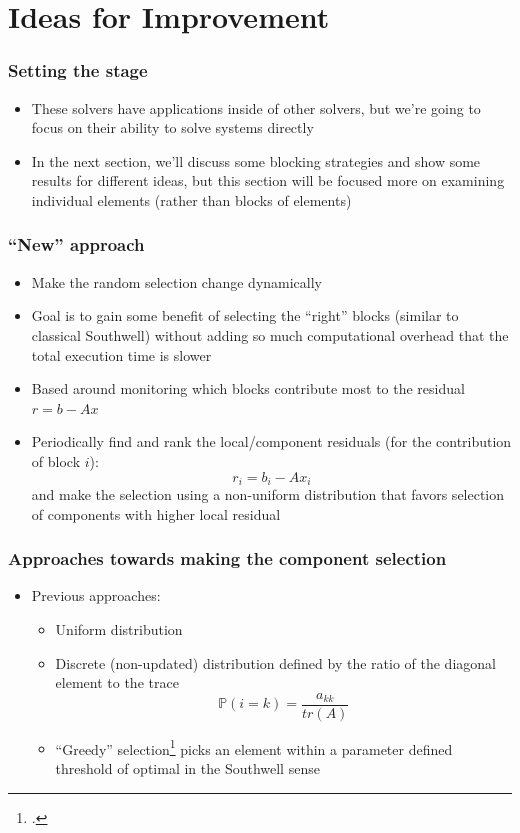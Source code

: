 \documentclass{beamer}
\begin{document}
\section{Ideas for Improvement}

\begin{frame}
	\frametitle{Setting the stage}
	\begin{itemize}
		\item These solvers have applications inside of other solvers, but we're going to focus on their ability to solve systems directly
		\item In the next section, we'll discuss some blocking strategies and show some results for different ideas, but this section will be focused more on examining individual elements (rather than blocks of elements)
	\end{itemize}
\end{frame}

\begin{frame}
	\frametitle{``New'' approach}
	\begin{itemize}
		\item Make the random selection change dynamically 
		\item Goal is to gain some benefit of selecting the ``right'' blocks (similar to classical Southwell) without adding so much computational overhead that the total execution time is slower
		\item Based around monitoring which blocks contribute most to the residual $r = b - Ax$
		\item Periodically find and rank the local/component residuals (for the contribution of block $i$):
			\begin{equation}
				r_i = b_i - Ax_i
			\end{equation}
			and make the selection using a non-uniform distribution that favors selection of components with higher local residual
	\end{itemize}
\end{frame}

\begin{frame}
	\frametitle{Approaches towards making the component selection}
	\begin{itemize}
		\item Previous approaches:
		    \begin{itemize}
		        \item Uniform distribution
		        \item Discrete (non-updated) distribution defined by the ratio of the diagonal element to the trace
		            \begin{equation}
		                \mathbb{P}(i=k) = \frac{a_{kk}}{tr(A)}
		            \end{equation}
		        \item ``Greedy'' selection\footcite{griebel2012greedy} picks an element within a parameter defined threshold of optimal in the Southwell sense 
		    \end{itemize}
	\end{itemize}
\end{frame}
\end{document}
